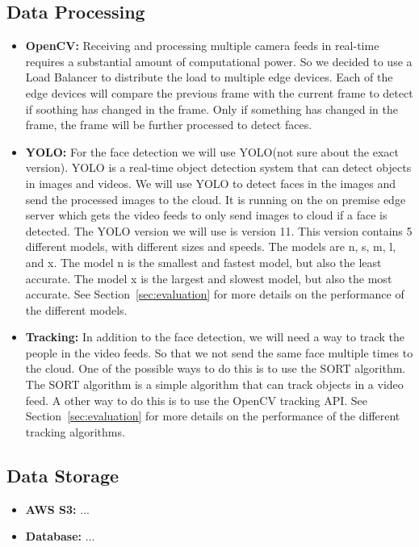 \documentclass[conference]{IEEEtran}
\begin{document}
\subsection{Data Processing}
\begin{itemize}
      \item \textbf{OpenCV:} Receiving and processing multiple camera feeds in real-time requires a substantial amount of computational power.
            So we decided to use a Load Balancer to distribute the load to multiple edge devices.
            Each of the edge devices will compare the previous frame with the current frame to detect if soothing has changed in the frame.
            Only if something has changed in the frame, the frame will be further processed to detect faces.
      \item \textbf{YOLO:} For the face detection we will use YOLO(not sure about the exact version). YOLO is a real-time object detection system that can detect objects in images and videos.
            We will use YOLO to detect faces in the images and send the processed images to the cloud. It is running on the on premise edge server which gets the video feeds to only
            send images to cloud if a face is detected.
            The YOLO version we will use is version 11. This version contains 5 different models, with different sizes and speeds. The models are n, s, m, l, and x.
            The model n is the smallest and fastest model, but also the least accurate. The model x is the largest and slowest model, but also the most accurate.
            See Section~\ref{sec:evaluation} for more details on the performance of the different models.
      \item \textbf{Tracking:} In addition to the face detection, we will need a way to track the people in the video feeds. So that we not send the same face multiple times to the cloud.
            One of the possible ways to do this is to use the SORT algorithm. The SORT algorithm is a simple algorithm that can track objects in a video feed.
            A other way to do this is to use the OpenCV tracking API. See Section~\ref{sec:evaluation} for more details on the performance of the different tracking algorithms.
\end{itemize}
\subsection{Data Storage}
\begin{itemize}
      \item \textbf{AWS S3:} ...
      \item \textbf{Database:} ...
\end{itemize}
\end{document}
